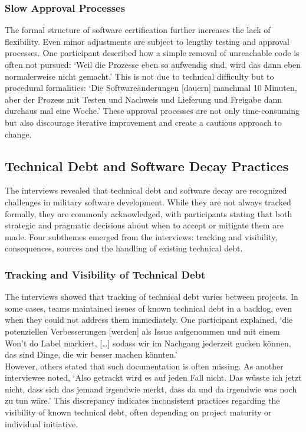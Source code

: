 \subsubsection{Slow Approval Processes}
The formal structure of software certification further increases the lack of flexibility. Even minor adjustments are subject to lengthy testing and approval processes. One participant described how a simple removal of unreachable code is often not pursued:
`Weil die Prozesse eben so aufwendig sind, wird das dann eben normalerweise nicht gemacht.' This is not due to technical difficulty but to procedural formalities: `Die Softwareänderungen [dauern] manchmal 10 Minuten, aber der Prozess mit Testen und Nachweis und Lieferung und Freigabe dann durchaus mal eine Woche.'
These approval processes are not only time-consuming but also discourage iterative improvement and create a cautious approach to change.\\

\subsection{Technical Debt and Software Decay Practices}
The interviews revealed that technical debt and software decay are recognized challenges in military software development. While they are not always tracked formally, they are commonly acknowledged, with participants stating that both strategic and pragmatic decisions about when to accept or mitigate them are made.
Four subthemes emerged from the interviews: tracking and visibility, consequences, sources and the handling of existing technical debt.

\subsubsection{Tracking and Visibility of Technical Debt}
The interviews showed that tracking of technical debt varies between projects. In some cases, teams maintained issues of known technical debt in a backlog, even when they could not address them immediately. One participant explained, `die potenziellen Verbesserungen [werden] als Issue aufgenommen und mit einem Won't do Label markiert, [\ldots]
sodass wir im Nachgang jederzeit gucken können, das sind Dinge, die wir besser machen könnten.'\\
However, others stated that such documentation is often missing. As another interviewee noted, `Also getrackt wird es auf jeden Fall nicht. Das wüsste ich jetzt nicht, dass sich das jemand irgendwie merkt, dass da und da irgendwie was noch zu tun wäre.'
This discrepancy indicates inconsistent practices regarding the visibility of known technical debt, often depending on project maturity or individual initiative.\\

